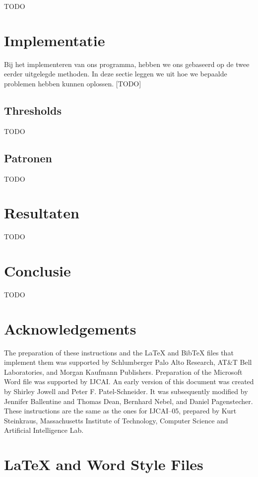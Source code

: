 \documentclass{article}
\begin{document}
TODO

\section{Implementatie}

Bij het implementeren van ons programma, hebben we ons gebaseerd op de twee eerder uitgelegde methoden. In deze sectie leggen we uit hoe we bepaalde problemen hebben kunnen oplossen. [TODO]

\subsection{Thresholds}

TODO

\subsection{Patronen}

TODO

\section{Resultaten}
TODO

\section{Conclusie}
TODO

\section*{Acknowledgements}

The preparation of these instructions and the \LaTeX{} and Bib\TeX{}
files that implement them was supported by Schlumberger Palo Alto
Research, AT\&T Bell Laboratories, and Morgan Kaufmann Publishers.
Preparation of the Microsoft Word file was supported by IJCAI.  An
early version of this document was created by Shirley Jowell and Peter
F. Patel-Schneider.  It was subsequently modified by Jennifer
Ballentine and Thomas Dean, Bernhard Nebel, and Daniel Pagenstecher.
These instructions are the same as the ones for IJCAI--05, prepared by
Kurt Steinkraus, Massachusetts Institute of Technology, Computer
Science and Artificial Intelligence Lab.

\appendix

\section{\LaTeX{} and Word Style Files}\label{stylefiles}
\end{document}
